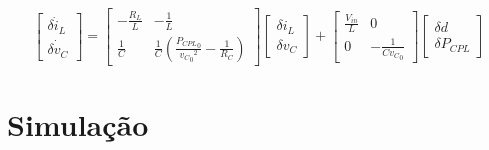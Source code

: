 \begin{equation}
  \begin{bmatrix}
    \dot{\delta i_L} \\ \dot{\delta v_C}
  \end{bmatrix}
  =
  \begin{bmatrix}
    -\frac{R_L}{L} & -\frac{1}{L}                                                                \\
    \frac{1}{C}    & \frac{1}{C}\left(\frac{{P_{CPL}}_0}{{{{v_{C}}_0}^2}} - \frac{1}{R_C}\right)
  \end{bmatrix}
  \begin{bmatrix}
    \delta i_L \\ \delta v_C
  \end{bmatrix}
  +
  \begin{bmatrix}
    {\frac{V_{in}}{L}} & 0                     \\
    0                  & {-\frac{1}{C{v_C}_0}}
  \end{bmatrix}
  \begin{bmatrix}
    \delta d \\ \delta P_{CPL}
  \end{bmatrix}
\end{equation}

\section{Simulação}
